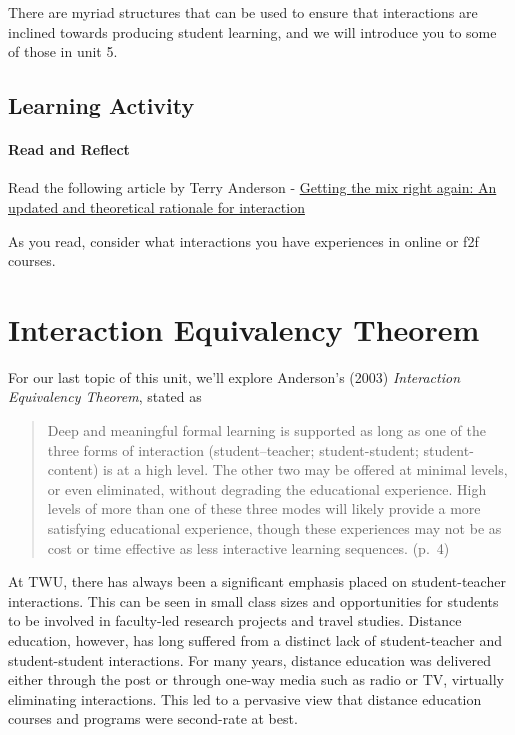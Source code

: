 \documentclass[
]{book}
\begin{document}
There are myriad structures that can be used to ensure that interactions are inclined towards producing student learning, and we will introduce you to some of those in unit 5.

\hypertarget{learning-activity-1}{%
\subsection*{Learning Activity}\label{learning-activity-1}}

\begin{reflect}
\hypertarget{read-and-reflect}{%
\paragraph{Read and Reflect}\label{read-and-reflect}}

Read the following article by Terry Anderson -
\href{http://www.irrodl.org/index.php/irrodl/article/view/149/230}{Getting
the mix right again: An updated and theoretical rationale for
interaction}

As you read, consider what interactions you have experiences in online
or f2f courses.
\end{reflect}

\hypertarget{interaction-equivalency-theorem}{%
\section{Interaction Equivalency Theorem}\label{interaction-equivalency-theorem}}

For our last topic of this unit, we'll explore Anderson's (2003) \emph{Interaction Equivalency Theorem}, stated as

\begin{quote}
Deep and meaningful formal learning is supported as long as one of the three forms of interaction (student--teacher; student-student; student-content) is at a high level. The other two may be offered at minimal levels, or even eliminated, without degrading the educational experience.
High levels of more than one of these three modes will likely provide a more satisfying educational experience, though these experiences may not be as cost or time effective as less interactive learning sequences. (p.~4)
\end{quote}

At TWU, there has always been a significant emphasis placed on student-teacher interactions. This can be seen in small class sizes and opportunities for students to be involved in faculty-led research projects and travel studies. Distance education, however, has long suffered from a distinct lack of student-teacher and student-student interactions. For many years, distance education was delivered either through the post or through one-way media such as radio or TV, virtually eliminating interactions. This led to a pervasive view that distance education courses and programs were second-rate at best.
\end{document}
